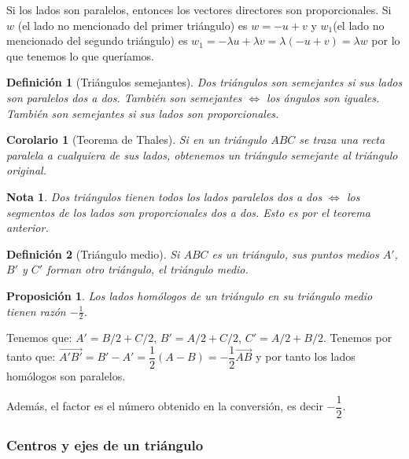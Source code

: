\documentclass[11pt, a4paper]{article}
\makeatletter
\newif\IfInSansMode
\let\oldsf\sffamily
\renewcommand*{\sffamily}{\oldsf\mathversion{sans}\InSansModetrue}
\let\oldnorm\normalfont
\renewcommand*{\normalfont}{\oldnorm\InSansModefalse\mathversion{normal}}
\renewenvironment{proof}[1][\proofname] {\vspace{-15pt}\par\pushQED{\qed}\normalfont\topsep6\p@\@plus6\p@\relax\trivlist\item[\hskip\labelsep\it#1\@addpunct{.}]\ignorespaces}{\popQED\endtrivlist\@endpefalse}
\renewcommand{\vec}{\overrightarrow}
\renewenvironment{proof}[1][\proofname] {\par\pushQED{\qed}\normalfont\topsep6\p@\@plus6\p@\relax\trivlist\item[\hskip\labelsep\itshape\sffamily#1\@addpunct{.}]\ignorespaces}{\popQED\endtrivlist\@endpefalse}
\theoremstyle{theorem-style}
\newtheorem{nprop}{Proposición}[section]
\newtheorem{ncor}{Corolario}[section]
\theoremstyle{definition-style}
\newtheorem{ndef}{Definición}[section]
\theoremstyle{remark-style}
\newtheorem*{nota}{Nota}
\theoremstyle{example-style}
\makeatother
\begin{document}
  \begin{proof}
    Si los lados son paralelos, entonces los vectores directores son proporcionales.
    Si $w$ (el lado no mencionado del primer triángulo) es $w=-u+v$ y $w_1$(el lado no mencionado del segundo triángulo) es $w_1 = - \lambda u + \lambda v = \lambda (-u+v) = \lambda w$  por lo que tenemos lo que queríamos.
  \end{proof}

\begin{ndef}[Triángulos semejantes]
  Dos triángulos son semejantes si sus lados son paralelos dos a dos. También son semejantes $\iff$ los ángulos son iguales. También son semejantes si sus lados son proporcionales.
\end{ndef}

\begin{ncor}[Teorema de Thales]
  Si en un triángulo $ABC$ se traza una recta paralela a cualquiera de sus lados, obtenemos un triángulo semejante al triángulo original.
\end{ncor}

\begin{nota}
  Dos triángulos tienen todos los lados paralelos dos a dos $\iff$ los segmentos de los lados son proporcionales dos a dos. Esto es por el teorema anterior.
\end{nota}

\begin{ndef}[Triángulo medio]
  Si $ABC$ es un triángulo, sus puntos medios $A'$, $B'$ y $C'$ forman otro triángulo, el \textit{triángulo medio}.
\end{ndef}

\begin{nprop}
  Los lados homólogos de un triángulo en su triángulo medio tienen razón $-\frac{1}{2}$.
\end{nprop}

\begin{proof}
  Tenemos que: $A' = B/2 + C/2$, $B' = A/2+C/2$, $C' = A/2 + B/2$. Tenemos por tanto que: $\vec{A'B'} = B'-A' = \dfrac{1}{2}(A-B) = -\dfrac{1}{2} \vec{AB}$ y por tanto los lados homólogos son paralelos.

      Además, el factor es el número obtenido en la conversión, es decir $-\dfrac{1}{2}$.
\end{proof}

\subsubsection{Centros y ejes de un triángulo}
\end{document}
